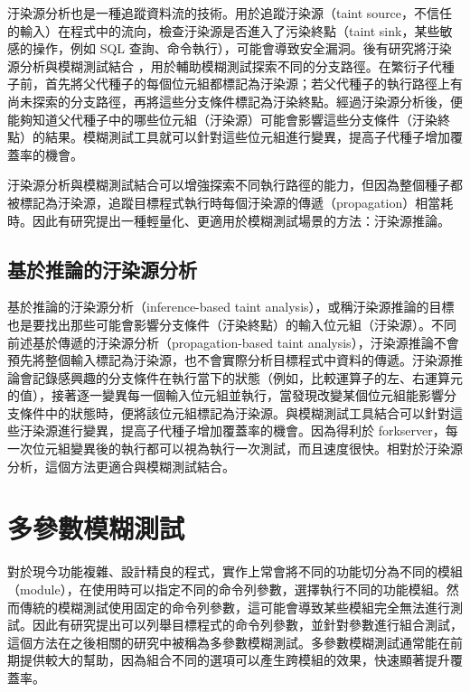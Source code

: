 汙染源分析也是一種追蹤資料流的技術。用於追蹤汙染源（taint source，不信任的輸入）在程式中的流向，檢查汙染源是否進入了污染終點（taint sink，某些敏感的操作，例如 SQL 查詢、命令執行），可能會導致安全漏洞。後有研究將汙染源分析與模糊測試結合 \cite{chen2018angora,rawat2017vuzzer,wang2010taintscope}，用於輔助模糊測試探索不同的分支路徑。在繁衍子代種子前，首先將父代種子的每個位元組都標記為汙染源；若父代種子的執行路徑上有尚未探索的分支路徑，再將這些分支條件標記為汙染終點。經過汙染源分析後，便能夠知道父代種子中的哪些位元組（汙染源）可能會影響這些分支條件（汙染終點）的結果。模糊測試工具就可以針對這些位元組進行變異，提高子代種子增加覆蓋率的機會。

汙染源分析與模糊測試結合可以增強探索不同執行路徑的能力，但因為整個種子都被標記為汙染源，追蹤目標程式執行時每個汙染源的傳遞（propagation）相當耗時。因此有研究提出一種輕量化、更適用於模糊測試場景的方法：汙染源推論。

\subsection{基於推論的汙染源分析}

基於推論的汙染源分析（inference-based taint analysis）\cite{aschermann2019redqueen,gan2020greyone,lemieux2018fairfuzz,you2019profuzzer}，或稱汙染源推論的目標也是要找出那些可能會影響分支條件（汙染終點）的輸入位元組（汙染源）。不同前述基於傳遞的汙染源分析（propagation-based taint analysis），汙染源推論不會預先將整個輸入標記為汙染源，也不會實際分析目標程式中資料的傳遞。汙染源推論會記錄感興趣的分支條件在執行當下的狀態（例如，比較運算子的左、右運算元的值），接著逐一變異每一個輸入位元組並執行，當發現改變某個位元組能影響分支條件中的狀態時，便將該位元組標記為汙染源。與模糊測試工具結合可以針對這些汙染源進行變異，提高子代種子增加覆蓋率的機會。因為得利於 forkserver，每一次位元組變異後的執行都可以視為執行一次測試，而且速度很快。相對於汙染源分析，這個方法更適合與模糊測試結合。

\section{多參數模糊測試}

對於現今功能複雜、設計精良的程式，實作上常會將不同的功能切分為不同的模組（module），在使用時可以指定不同的命令列參數，選擇執行不同的功能模組。然而傳統的模糊測試使用固定的命令列參數，這可能會導致某些模組完全無法進行測試。因此有研究提出可以列舉目標程式的命令列參數，並針對參數進行組合測試，這個方法在之後相關的研究中被稱為多參數模糊測試。多參數模糊測試通常能在前期提供較大的幫助，因為組合不同的選項可以產生跨模組的效果，快速顯著提升覆蓋率。

